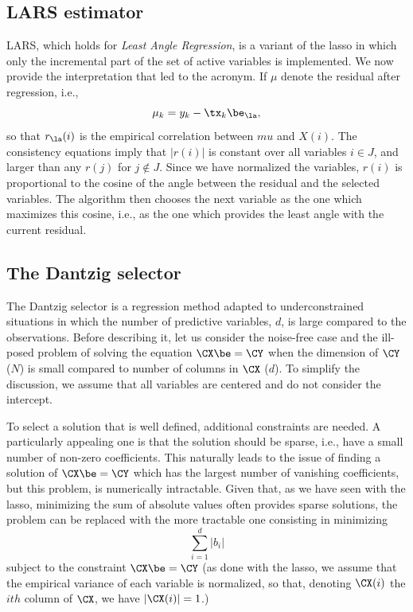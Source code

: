 \subsection{LARS estimator}
LARS, which holds for {\em Least Angle Regression}, is a variant of the
lasso in which only the incremental part of the set of active
variables is implemented. We now provide the interpretation that led
to the acronym. If $\mu$ denote the residual after regression, i.e.,
$$
\mu_k = y_k - \tx_k\be_\la,
$$
so that $r_\la(i)$ is the empirical correlation between $mu$ and $X(i)$.
The consistency equations imply that $|r(i)|$ is constant over all
variables $i\in J$, and larger than any $r(j)$ for $j\not\in J$. Since
we have normalized the variables, $r(i)$ is proportional to the cosine
of the angle between the residual and the selected variables. The
algorithm then chooses the next variable as the one which maximizes
this cosine, i.e., as the one which provides the least angle with the
current residual.

\subsection{The Dantzig selector}

The Dantzig selector is a regression method adapted to
underconstrained situations in which the number of predictive
variables, $d$, is large compared to the observations. Before
describing it, let us consider the noise-free case and the ill-posed problem of
solving the equation
$\CX \be = \CY$ when the dimension of $\CY$ ($N$) is small compared to
number of columns in $\CX$ ($d$). To simplify the discussion, we
assume that all variables are centered and do not consider the
intercept.

To select a solution that is well defined, additional constraints
are needed. A particularly appealing one is that the solution should
be sparse, i.e., have a small number of non-zero coefficients. This
naturally leads to the issue of finding a solution of $\CX \be
= \CY$ which  has the largest number of vanishing coefficients, but this problem,
is numerically intractable. Given that, as we have seen with
the lasso, minimizing the sum of absolute values often provides sparse
solutions, the problem can be replaced with the more tractable one
consisting in minimizing 
$$
\sum_{i=1}^d |b_i|
$$
subject to the constraint $\CX \be = \CY$ (as done with the lasso, we
assume that the empirical variance of each variable is normalized, so
that, denoting $\CX(i)$ the $ith$ column of $\CX$, we have $|\CX(i)| = 1$.)

